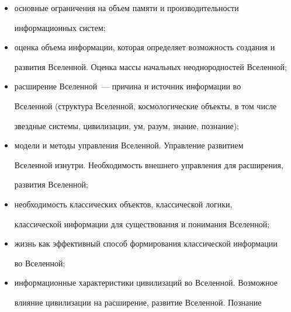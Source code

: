 \begin{itemize}
   информационные ограничения на формирование, развитие, 


взаимопревращение фундаментальных и элементарных частиц, атомов, 


молекул, газов, жидкостей, твердых тел, звезд, черных дыр,.. РНК, 


ДНК, клеток, вирусов, микроорганизмов и~др.;


   \item 


   основные ограничения на объем памяти и производительности 


информационных систем;


   \item 


   оценка объема информации, которая определяет возможность создания и 


развития Вселенной. Оценка массы начальных неоднородностей Вселенной;


   \item 


   расширение Вселенной~--- причина и источник информации во 


Вселенной (структура Вселенной, космологические объекты, в том числе 


звездные сис\-те\-мы, цивилизации, ум, разум, знание, познание);


\item    


   модели и методы управления Вселенной. Управление развитием 


Вселенной изнутри. Необходимость внешнего управления для расширения, 


развития Вселенной;


   \item 


   необходимость классических объектов, классической логики, 


классической информации для существования и понимания Вселенной;


   \item 


   жизнь как эффективный способ формирования классической информации 


во Вселенной;


   \item 


   информационные характеристики цивилизаций во Вселенной. Возможное 


влияние цивилизации на расширение, развитие Вселенной. Познание 



\end{itemize}

